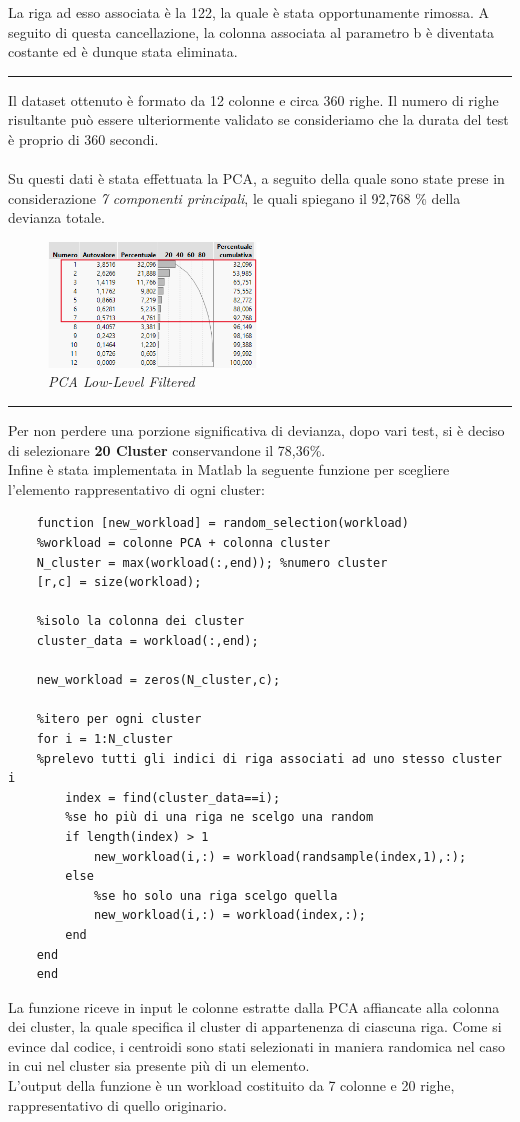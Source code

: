 La riga ad esso associata è la 122, la quale è stata opportunamente rimossa. A seguito di questa cancellazione, la colonna associata al parametro b è diventata costante ed è dunque stata eliminata.
\\
\hrule
\vspace{0.3cm}
Il dataset ottenuto è formato da 12 colonne e circa 360 righe. Il numero di righe risultante può essere ulteriormente validato se consideriamo che la durata del test è proprio di 360 secondi.
\\
\\
Su questi dati è stata effettuata la PCA, a seguito della quale sono state prese in considerazione \textit{7 componenti principali}, le quali spiegano il 92,768 \% della devianza totale.
\begin{figure}[H]
	\centering
	\includegraphics[width=0.5\textwidth]{img/hw3/PCA7.png}
	\caption{\textit{PCA Low-Level Filtered}}
\end{figure}
\hrule
\vspace{0.3cm}
Per non perdere una porzione significativa di devianza, dopo vari test, si è deciso di selezionare \textbf{20 Cluster} conservandone il 78,36\%.
\\
Infine è stata implementata in Matlab la seguente funzione per scegliere l'elemento rappresentativo di ogni cluster:
\begin{verbatim}
	function [new_workload] = random_selection(workload)
	%workload = colonne PCA + colonna cluster
	N_cluster = max(workload(:,end)); %numero cluster
	[r,c] = size(workload);
	
	%isolo la colonna dei cluster
	cluster_data = workload(:,end);
	
	new_workload = zeros(N_cluster,c);
	
	%itero per ogni cluster
	for i = 1:N_cluster
	%prelevo tutti gli indici di riga associati ad uno stesso cluster i
		index = find(cluster_data==i); 
		%se ho più di una riga ne scelgo una random
		if length(index) > 1
			new_workload(i,:) = workload(randsample(index,1),:); 
		else
			%se ho solo una riga scelgo quella
			new_workload(i,:) = workload(index,:);
		end
	end
	end
\end{verbatim}
La funzione riceve in input le colonne estratte dalla PCA affiancate alla colonna dei cluster, la quale specifica il cluster di appartenenza di ciascuna riga.
Come si evince dal codice, i centroidi sono stati selezionati in maniera randomica nel caso in cui nel cluster sia presente più di un elemento.
\\
L'output della funzione è un workload costituito da 7 colonne e 20 righe, rappresentativo di quello originario.

